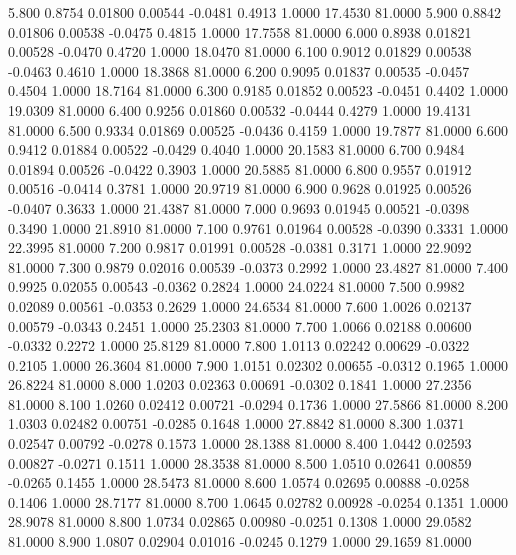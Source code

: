    5.800   0.8754   0.01800   0.00544  -0.0481   0.4913   1.0000  17.4530  81.0000
   5.900   0.8842   0.01806   0.00538  -0.0475   0.4815   1.0000  17.7558  81.0000
   6.000   0.8938   0.01821   0.00528  -0.0470   0.4720   1.0000  18.0470  81.0000
   6.100   0.9012   0.01829   0.00538  -0.0463   0.4610   1.0000  18.3868  81.0000
   6.200   0.9095   0.01837   0.00535  -0.0457   0.4504   1.0000  18.7164  81.0000
   6.300   0.9185   0.01852   0.00523  -0.0451   0.4402   1.0000  19.0309  81.0000
   6.400   0.9256   0.01860   0.00532  -0.0444   0.4279   1.0000  19.4131  81.0000
   6.500   0.9334   0.01869   0.00525  -0.0436   0.4159   1.0000  19.7877  81.0000
   6.600   0.9412   0.01884   0.00522  -0.0429   0.4040   1.0000  20.1583  81.0000
   6.700   0.9484   0.01894   0.00526  -0.0422   0.3903   1.0000  20.5885  81.0000
   6.800   0.9557   0.01912   0.00516  -0.0414   0.3781   1.0000  20.9719  81.0000
   6.900   0.9628   0.01925   0.00526  -0.0407   0.3633   1.0000  21.4387  81.0000
   7.000   0.9693   0.01945   0.00521  -0.0398   0.3490   1.0000  21.8910  81.0000
   7.100   0.9761   0.01964   0.00528  -0.0390   0.3331   1.0000  22.3995  81.0000
   7.200   0.9817   0.01991   0.00528  -0.0381   0.3171   1.0000  22.9092  81.0000
   7.300   0.9879   0.02016   0.00539  -0.0373   0.2992   1.0000  23.4827  81.0000
   7.400   0.9925   0.02055   0.00543  -0.0362   0.2824   1.0000  24.0224  81.0000
   7.500   0.9982   0.02089   0.00561  -0.0353   0.2629   1.0000  24.6534  81.0000
   7.600   1.0026   0.02137   0.00579  -0.0343   0.2451   1.0000  25.2303  81.0000
   7.700   1.0066   0.02188   0.00600  -0.0332   0.2272   1.0000  25.8129  81.0000
   7.800   1.0113   0.02242   0.00629  -0.0322   0.2105   1.0000  26.3604  81.0000
   7.900   1.0151   0.02302   0.00655  -0.0312   0.1965   1.0000  26.8224  81.0000
   8.000   1.0203   0.02363   0.00691  -0.0302   0.1841   1.0000  27.2356  81.0000
   8.100   1.0260   0.02412   0.00721  -0.0294   0.1736   1.0000  27.5866  81.0000
   8.200   1.0303   0.02482   0.00751  -0.0285   0.1648   1.0000  27.8842  81.0000
   8.300   1.0371   0.02547   0.00792  -0.0278   0.1573   1.0000  28.1388  81.0000
   8.400   1.0442   0.02593   0.00827  -0.0271   0.1511   1.0000  28.3538  81.0000
   8.500   1.0510   0.02641   0.00859  -0.0265   0.1455   1.0000  28.5473  81.0000
   8.600   1.0574   0.02695   0.00888  -0.0258   0.1406   1.0000  28.7177  81.0000
   8.700   1.0645   0.02782   0.00928  -0.0254   0.1351   1.0000  28.9078  81.0000
   8.800   1.0734   0.02865   0.00980  -0.0251   0.1308   1.0000  29.0582  81.0000
   8.900   1.0807   0.02904   0.01016  -0.0245   0.1279   1.0000  29.1659  81.0000
